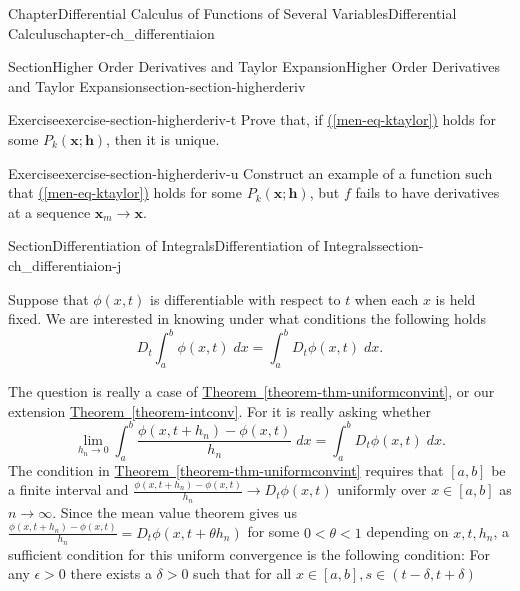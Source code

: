 \documentclass[oneside,10pt,]{book}
\newcommand{\xreffont}{\relax}
\numberwithin{equation}{section}
\newcommand{\bh}{\mathbf{h}}
\newcommand{\bx}{\mathbf{x}}
\begin{document}
\begin{chapterptx}{Chapter}{Differential Calculus of Functions of Several Variables}{}{Differential Calculus}{}{}{chapter-ch_differentiaion}
\begin{sectionptx}{Section}{Higher Order Derivatives and Taylor Expansion}{}{Higher Order Derivatives and Taylor Expansion}{}{}{section-section-higherderiv}
\begin{inlineexercise}{Exercise}{}{exercise-section-higherderiv-t}%
Prove that, if \hyperref[men-eq-ktaylor]{({\xreffont\ref{men-eq-ktaylor}})} holds for some \(P_{k}(\bx; \bh)\), then it is unique.%
\end{inlineexercise}%
\begin{inlineexercise}{Exercise}{}{exercise-section-higherderiv-u}%
Construct an example of a function such that \hyperref[men-eq-ktaylor]{({\xreffont\ref{men-eq-ktaylor}})} holds for some \(P_{k}(\bx; \bh)\), but \(f\) fails to have derivatives at a sequence \(\bx_{m}\to \bx\).%
\end{inlineexercise}%
\end{sectionptx}
%
%
\typeout{************************************************}
\typeout{************************************************}
%
\begin{sectionptx}{Section}{Differentiation of Integrals}{}{Differentiation of Integrals}{}{}{section-ch_differentiaion-j}
\begin{introduction}{}%
Suppose that \(\phi(x, t)\) is differentiable with respect to \(t\) when each \(x\) is held fixed. We are interested in knowing under what conditions the following holds%
\begin{equation}
D_{t}\int_{a}^{b }\phi(x, t)\; dx = \int_{a}^{b }D_{t}\phi(x, t)\; dx.\label{men-diffInt}
\end{equation}
%
\par
The question is really a case of \hyperref[theorem-thm-uniformconvint]{Theorem~{\xreffont\ref{theorem-thm-uniformconvint}}}, or our extension  \hyperref[theorem-intconv]{Theorem~{\xreffont\ref{theorem-intconv}}}. For it is really asking whether%
\begin{equation*}
\lim_{h_{n}\to 0} \int_{a}^{b }\frac{\phi(x, t+h_{n})-\phi(x, t)}{h_{n}}\; dx
=\int_{a}^{b }D_{t}\phi(x, t)\; dx.
\end{equation*}
The condition in \hyperref[theorem-thm-uniformconvint]{Theorem~{\xreffont\ref{theorem-thm-uniformconvint}}} requires that \([a, b]\) be a finite interval and \(\frac{\phi(x, t+h_{n})-\phi(x, t)}{h_{n}} \to D_{t}\phi(x, t)\) uniformly over \(x\in [a, b]\) as \(n\to \infty\). Since the mean value theorem gives us \(\frac{\phi(x, t+h_{n})-\phi(x, t)}{h_{n}}=D_{t}\phi(x, t+\theta h_{n})\) for some \(0 < \theta < 1\) depending on \(x, t, h_{n}\), a sufficient condition for this uniform convergence is the following condition: For any \(\epsilon >0\) there exists a \(\delta>0\) such that for all \(x\in [a, b], s \in (t-\delta, t+\delta)\)%

\end{introduction}
\end{sectionptx}
\end{chapterptx}
\end{document}
